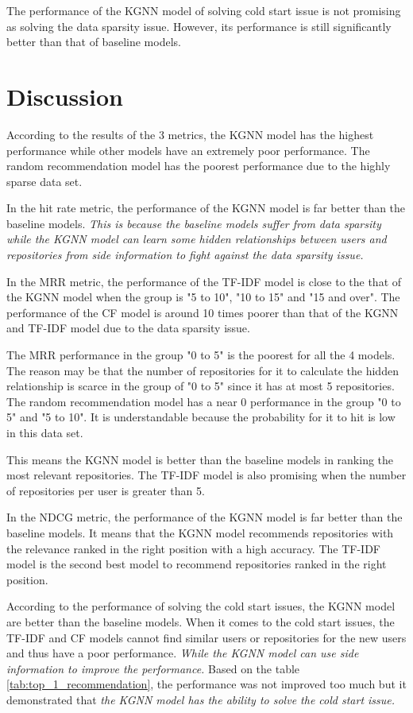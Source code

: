 \documentclass[11pt,twoside]{report}
\begin{document}
The performance of the KGNN model of solving cold start issue is not promising as solving the data sparsity issue. However, its performance is still significantly better than that of baseline models.

\section{Discussion}
According to the results of the 3 metrics, the KGNN model has the highest performance while other models have an extremely poor performance. The random recommendation model has the poorest performance due to the highly sparse data set.

In the hit rate metric, the performance of the KGNN model is far better than the baseline models. \textit{This is because the baseline models suffer from data sparsity while the KGNN model can learn some hidden relationships between users and repositories from side information to fight against the data sparsity issue.}

In the MRR metric, the performance of the TF-IDF model is close to the that of the KGNN model when the group is "5 to 10", "10 to 15" and "15 and over". The performance of the CF model is around 10 times poorer than that of the KGNN and TF-IDF model due to the data sparsity issue.

The MRR performance in the group "0 to 5" is the poorest for all the 4 models. The reason may be that the number of repositories for it to calculate the hidden relationship is scarce in the group of "0 to 5" since it has at most 5 repositories. The random recommendation model has a near 0 performance in the group "0 to 5" and "5 to 10". It is understandable because the probability for it to hit is low in this data set.

This means the KGNN model is better than the baseline models in ranking the most relevant repositories. The TF-IDF model is also promising when the number of repositories per user is greater than 5.

In the NDCG metric, the performance of the KGNN model is far better than the baseline models. It means that the KGNN model recommends repositories with the relevance ranked in the right position with a high accuracy. The TF-IDF model is the second best model to recommend repositories ranked in the right position.

According to the performance of solving the cold start issues, the KGNN model are better than the baseline models. When it comes to the cold start issues, the TF-IDF and CF models cannot find similar users or repositories for the new users and thus have a poor performance. \textit{While the KGNN model can use side information to improve the performance.} Based on the table \ref{tab:top_1_recommendation}, the performance was not improved too much but it demonstrated that \textit{the KGNN model has the ability to solve the cold start issue.}
\end{document}
